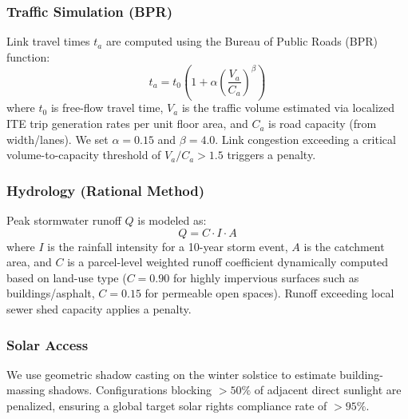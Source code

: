 \documentclass[final,3p,times]{elsarticle}
\begin{document}
\subsubsection{Traffic Simulation (BPR)}
Link travel times $t_a$ are computed using the Bureau of Public Roads (BPR) function:
\begin{equation}
t_a = t_0 \left( 1 + \alpha \left( \frac{V_a}{C_a} \right)^\beta \right)
\end{equation}
where $t_0$ is free-flow travel time, $V_a$ is the traffic volume estimated via localized ITE trip generation rates per unit floor area, and $C_a$ is road capacity (from width/lanes). We set $\alpha=0.15$ and $\beta=4.0$. Link congestion exceeding a critical volume-to-capacity threshold of $V_a/C_a > 1.5$ triggers a penalty.

\subsubsection{Hydrology (Rational Method)}
Peak stormwater runoff $Q$ is modeled as:
\begin{equation}
Q = C \cdot I \cdot A
\end{equation}
where $I$ is the rainfall intensity for a 10-year storm event, $A$ is the catchment area, and $C$ is a parcel-level weighted runoff coefficient dynamically computed based on land-use type ($C=0.90$ for highly impervious surfaces such as buildings/asphalt, $C=0.15$ for permeable open spaces). Runoff exceeding local sewer shed capacity applies a penalty.

\subsubsection{Solar Access}
We use geometric shadow casting on the winter solstice to estimate building-massing shadows. Configurations blocking $>50\%$ of adjacent direct sunlight are penalized, ensuring a global target solar rights compliance rate of $>95\%$.
\end{document}
